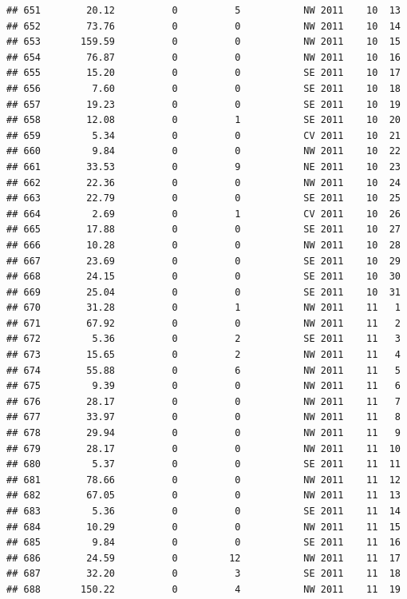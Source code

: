 \documentclass[
]{article}
\begin{document}
\begin{verbatim}
## 651        20.12          0          5           NW 2011    10  13
## 652        73.76          0          0           NW 2011    10  14
## 653       159.59          0          0           NW 2011    10  15
## 654        76.87          0          0           NW 2011    10  16
## 655        15.20          0          0           SE 2011    10  17
## 656         7.60          0          0           SE 2011    10  18
## 657        19.23          0          0           SE 2011    10  19
## 658        12.08          0          1           SE 2011    10  20
## 659         5.34          0          0           CV 2011    10  21
## 660         9.84          0          0           NW 2011    10  22
## 661        33.53          0          9           NE 2011    10  23
## 662        22.36          0          0           NW 2011    10  24
## 663        22.79          0          0           SE 2011    10  25
## 664         2.69          0          1           CV 2011    10  26
## 665        17.88          0          0           SE 2011    10  27
## 666        10.28          0          0           NW 2011    10  28
## 667        23.69          0          0           SE 2011    10  29
## 668        24.15          0          0           SE 2011    10  30
## 669        25.04          0          0           SE 2011    10  31
## 670        31.28          0          1           NW 2011    11   1
## 671        67.92          0          0           NW 2011    11   2
## 672         5.36          0          2           SE 2011    11   3
## 673        15.65          0          2           NW 2011    11   4
## 674        55.88          0          6           NW 2011    11   5
## 675         9.39          0          0           NW 2011    11   6
## 676        28.17          0          0           NW 2011    11   7
## 677        33.97          0          0           NW 2011    11   8
## 678        29.94          0          0           NW 2011    11   9
## 679        28.17          0          0           NW 2011    11  10
## 680         5.37          0          0           SE 2011    11  11
## 681        78.66          0          0           NW 2011    11  12
## 682        67.05          0          0           NW 2011    11  13
## 683         5.36          0          0           SE 2011    11  14
## 684        10.29          0          0           NW 2011    11  15
## 685         9.84          0          0           SE 2011    11  16
## 686        24.59          0         12           NW 2011    11  17
## 687        32.20          0          3           SE 2011    11  18
## 688       150.22          0          4           NW 2011    11  19

\end{verbatim}
\end{document}
